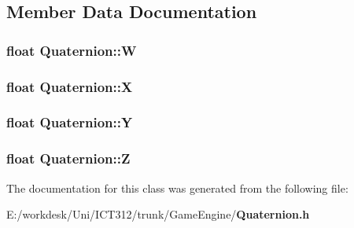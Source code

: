 \subsection{Member Data Documentation}
\subsubsection[{W}]{\setlength{\rightskip}{0pt plus 5cm}float Quaternion\+::\+W}\label{class_quaternion_adc2e55b935dcc2daefd60739bdb31cec}
\subsubsection[{X}]{\setlength{\rightskip}{0pt plus 5cm}float Quaternion\+::\+X}\label{class_quaternion_a2676f1a5ec3a2f69ebb953e4b5741c4b}
\subsubsection[{Y}]{\setlength{\rightskip}{0pt plus 5cm}float Quaternion\+::\+Y}\label{class_quaternion_aa3353a9f5afdf3614e37f9681441ae05}
\subsubsection[{Z}]{\setlength{\rightskip}{0pt plus 5cm}float Quaternion\+::\+Z}\label{class_quaternion_a533b5e90b6333d89190828f28721e61d}


The documentation for this class was generated from the following file\+:\begin{DoxyCompactItemize}
\item 
E\+:/workdesk/\+Uni/\+I\+C\+T312/trunk/\+Game\+Engine/{\bf Quaternion.\+h}\end{DoxyCompactItemize}
